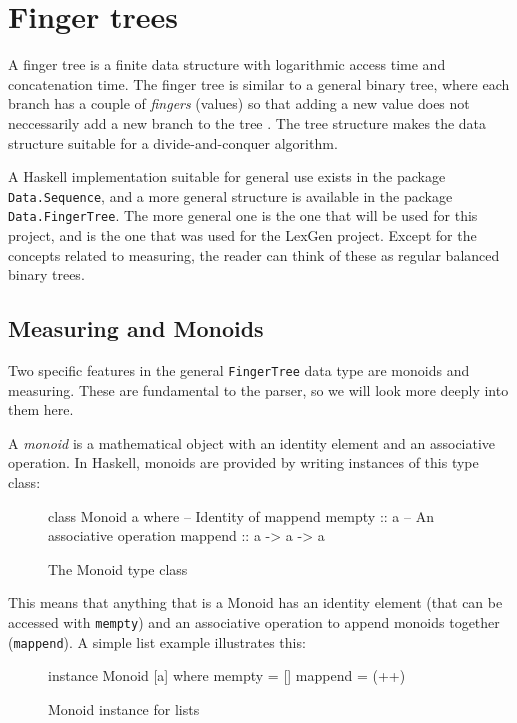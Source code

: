 \documentclass[a4paper,12pt,twosided]{report}
\renewcommand\cite{\citep}
\begin{document}
\section{Finger trees}
A finger tree is a finite data structure with logarithmic access time and
concatenation time. The finger tree is similar to a general binary tree, where each
branch has a couple of \textit{fingers} (values) so that adding a new value does
not neccessarily add a new branch to the tree \cite{fingertrees}. The tree
structure makes the data structure suitable for a divide-and-conquer algorithm.

A Haskell implementation suitable for general use exists in the package
\texttt{Data.Sequence}, and a more general structure is available in the
package \texttt{Data.FingerTree}. The more general one is the one that will be
used for this project, and is the one that was used for the LexGen project.
Except for the concepts related to measuring, the reader can think of these as
regular balanced binary trees. 

\subsection{Measuring and Monoids}
Two specific features in the general \texttt{FingerTree} data type are monoids and
measuring. These are fundamental to the parser, so we will look more deeply into
them here.

A \textit{monoid} is a mathematical object with an identity element and an
associative operation. In Haskell, monoids are provided by writing instances of
this type class:
\begin{figure}[H]
\begin{code}
class Monoid a where
    -- Identity of mappend
    mempty  :: a
    -- An associative operation
    mappend :: a -> a -> a
\end{code}
\caption{The Monoid type class}
\end{figure}

This means that anything that is a Monoid has an identity element (that can be
accessed with \texttt{mempty}) and an associative operation to append monoids
together (\texttt{mappend}). A simple list example illustrates this:

\begin{figure}[H]
\begin{code}
instance Monoid [a] where
    mempty = []
    mappend = (++)
\end{code}
\caption{Monoid instance for lists}
\end{figure}
\end{document}
